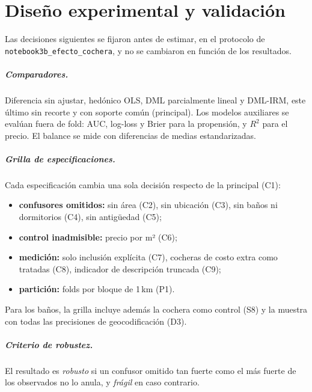 \chapter{Diseño experimental y validación}\label{cap:diseno}

Las decisiones siguientes se fijaron antes de estimar, en el protocolo de \texttt{notebook3b\_efecto\_cochera}, y no se cambiaron en función de los resultados.

\paragraph{Comparadores.} Diferencia sin ajustar, hedónico OLS, DML parcialmente lineal y DML-IRM, este último sin recorte y con soporte común (principal). Los modelos auxiliares se evalúan fuera de fold: AUC, log-loss y Brier para la propensión, y $R^2$ para el precio. El balance se mide con diferencias de medias estandarizadas.

\paragraph{Grilla de especificaciones.} Cada especificación cambia una sola decisión respecto de la principal (C1):
\begin{itemize}[itemsep=0pt]
\item \textbf{confusores omitidos:} sin área (C2), sin ubicación (C3), sin baños ni dormitorios (C4), sin antigüedad (C5);
\item \textbf{control inadmisible:} precio por m² (C6);
\item \textbf{medición:} solo inclusión explícita (C7), cocheras de costo extra como tratadas (C8), indicador de descripción truncada (C9);
\item \textbf{partición:} folds por bloque de 1\,km (P1).
\end{itemize}
Para los baños, la grilla incluye además la cochera como control (S8) y la muestra con todas las precisiones de geocodificación (D3).

\paragraph{Criterio de robustez.} El resultado es \emph{robusto} si un confusor omitido tan fuerte como el más fuerte de los observados no lo anula, y \emph{frágil} en caso contrario.

